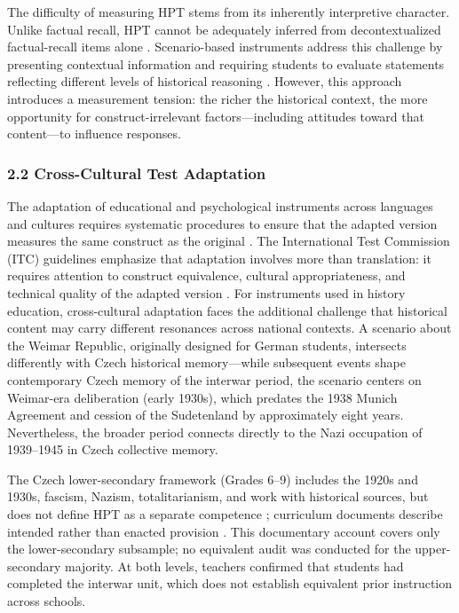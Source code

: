 \documentclass[
  12pt,
]{article}
\newcommand{\Loc}[1]{\linelabel{loc:#1}}
\newcommand{\LocEnd}[1]{\linelabel{loc:#1:end}}
\begin{document}
The difficulty of measuring HPT stems from its inherently interpretive character. Unlike factual recall, HPT cannot be adequately inferred from decontextualized factual-recall items alone \citep{Breakstone2014Try,Smith2017Cognitive}. Scenario-based instruments address this challenge by presenting contextual information and requiring students to evaluate statements reflecting different levels of historical reasoning \citep{Hartmann_Hasselhorn2008Historical,Seixas_et_al2015A_Design}. However, this approach introduces a measurement tension: the richer the historical context, the more opportunity for construct-irrelevant factors---including attitudes toward that content---to influence responses.

\hypertarget{cross-cultural-test-adaptation}{%
\subsubsection{2.2 Cross-Cultural Test Adaptation}\label{cross-cultural-test-adaptation}}

The adaptation of educational and psychological instruments across languages and cultures requires systematic procedures to ensure that the adapted version measures the same construct as the original \citep{Hambleton2005,ITC2017}. The International Test Commission (ITC) guidelines emphasize that adaptation involves more than translation: it requires attention to construct equivalence, cultural appropriateness, and technical quality of the adapted version \citep{ITC2017}. For instruments used in history education, cross-cultural adaptation faces the additional challenge that historical content may carry different resonances across national contexts. A scenario about the Weimar Republic, originally designed for German
students, intersects differently with Czech historical memory---while
subsequent events shape contemporary Czech memory of the interwar
period, the scenario centers on Weimar-era deliberation (early 1930s),
which predates the 1938 Munich Agreement and cession of the
Sudetenland by approximately eight years. Nevertheless, the broader
period connects directly to the Nazi occupation of 1939--1945 in Czech
collective memory.

\Loc{s22-curriculum}The Czech lower-secondary framework (Grades 6--9) includes the 1920s and
1930s, fascism, Nazism, totalitarianism, and work with historical sources, but
does not define HPT as a separate competence \citep[pp.~54--58, 140,
143]{RVPZV2023}; curriculum documents describe intended rather than enacted
provision \citep{Kaleta2025Sticking}. This documentary account covers only the
lower-secondary subsample; no equivalent audit was conducted for the
upper-secondary majority. At both levels, teachers confirmed that students had
completed the interwar unit, which does not establish equivalent prior
instruction across schools.\LocEnd{s22-curriculum}
\end{document}
